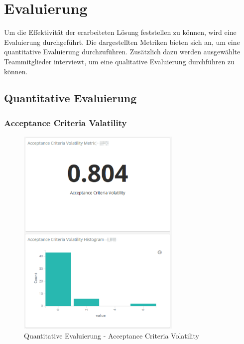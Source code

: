 \chapter{Evaluierung}

Um die Effektivität der erarbeiteten Lösung feststellen zu können, wird eine Evaluierung durchgeführt.
Die dargestellten Metriken bieten sich an, um eine quantitative Evaluierung durchzuführen.
Zusätzlich dazu werden ausgewählte Teammitglieder interviewt, um eine qualitative Evaluierung durchführen zu können.

\clearpage
\section{Quantitative Evaluierung}
\subsection*{Acceptance Criteria Valatility}

\begin{savenotes}
    \begin{figure}[H]
      \centering
      \includegraphics[width=0.7\textwidth]{img/eval-ac-volatility.png}
      \caption{Quantitative Evaluierung {-} Acceptance Criteria Volatility}\label{fig:eval_ac_volatility}
    \end{figure}
\end{savenotes}


